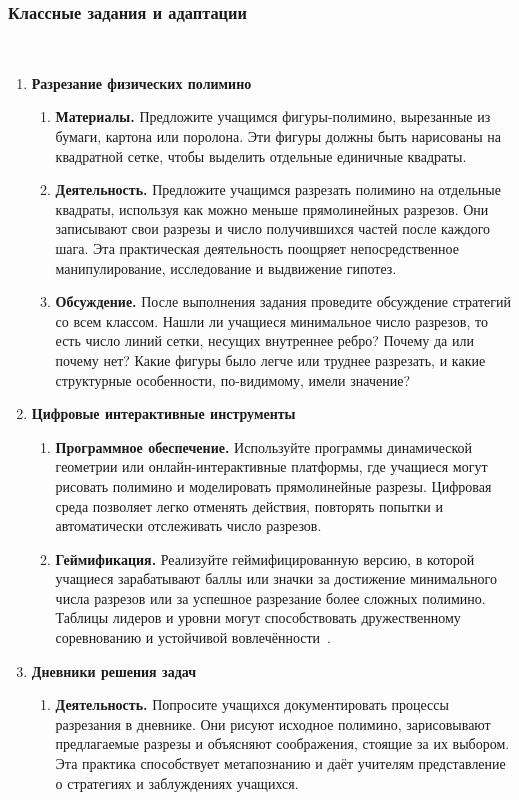 \documentclass[a4paper,14pt]{extreport}
\theoremstyle{plain}
\theoremstyle{definition}
\theoremstyle{remark}
\begin{document}
\subsubsection{Классные задания и адаптации}~\label{sec4.2.2}

\begin{enumerate}
	\item \textbf{Разрезание физических полимино}
	\begin{enumerate}
		\item \textbf{Материалы.} Предложите учащимся фигуры-полимино, вырезанные из бумаги, картона или поролона. Эти фигуры должны быть нарисованы на квадратной сетке, чтобы выделить отдельные единичные квадраты.
		\item \textbf{Деятельность.} Предложите учащимся разрезать полимино на отдельные квадраты, используя как можно меньше прямолинейных разрезов. Они записывают свои разрезы и число получившихся частей после каждого шага. Эта практическая деятельность поощряет непосредственное манипулирование, исследование и выдвижение гипотез.
		\item \textbf{Обсуждение.} После выполнения задания проведите обсуждение стратегий со всем классом. Нашли ли учащиеся минимальное число разрезов, то есть число линий сетки, несущих внутреннее ребро? Почему да или почему нет? Какие фигуры было легче или труднее разрезать, и какие структурные особенности, по-видимому, имели значение?
	\end{enumerate}
	
	\item \textbf{Цифровые интерактивные инструменты}
	\begin{enumerate}
		\item \textbf{Программное обеспечение.} Используйте программы динамической геометрии или онлайн-интерактивные платформы, где учащиеся могут рисовать полимино и моделировать прямолинейные разрезы. Цифровая среда позволяет легко отменять действия, повторять попытки и автоматически отслеживать число разрезов.
		\item \textbf{Геймификация.} Реализуйте геймифицированную версию, в которой учащиеся зарабатывают баллы или значки за достижение минимального числа разрезов или за успешное разрезание более сложных полимино. Таблицы лидеров и уровни могут способствовать дружественному соревнованию и устойчивой вовлечённости~\cite{Cal}.
	\end{enumerate}
	
	\item \textbf{Дневники решения задач}
	\begin{enumerate}
		\item \textbf{Деятельность.} Попросите учащихся документировать процессы разрезания в дневнике. Они рисуют исходное полимино, зарисовывают предлагаемые разрезы и объясняют соображения, стоящие за их выбором. Эта практика способствует метапознанию и даёт учителям представление о стратегиях и заблуждениях учащихся.
	\end{enumerate}
	

\end{enumerate}
\end{document}
